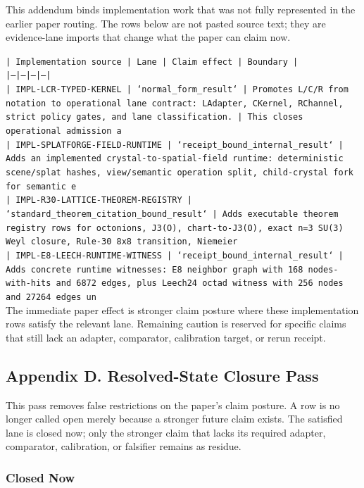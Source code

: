\documentclass[11pt]{article}
\begin{document}
This addendum binds implementation work that was not fully represented in the earlier paper routing. The rows below are not pasted source text; they are evidence-lane imports that change what the paper can claim now.

\noindent\texttt{| Implementation source | Lane | Claim effect | Boundary |}\\
\noindent\texttt{|---|---|---|---|}\\
\noindent\texttt{| IMPL-LCR-TYPED-KERNEL | `normal\_form\_result` | Promotes L/C/R from notation to operational lane contract: LAdapter, CKernel, RChannel, strict policy gates, and lane classification. | This closes operational admission a}\\
\noindent\texttt{| IMPL-SPLATFORGE-FIELD-RUNTIME | `receipt\_bound\_internal\_result` | Adds an implemented crystal-to-spatial-field runtime: deterministic scene/splat hashes, view/semantic operation split, child-crystal fork for semantic e}\\
\noindent\texttt{| IMPL-R30-LATTICE-THEOREM-REGISTRY | `standard\_theorem\_citation\_bound\_result` | Adds executable theorem registry rows for octonions, J3(O), chart-to-J3(O), exact n=3 SU(3) Weyl closure, Rule-30 8x8 transition, Niemeier }\\
\noindent\texttt{| IMPL-E8-LEECH-RUNTIME-WITNESS | `receipt\_bound\_internal\_result` | Adds concrete runtime witnesses: E8 neighbor graph with 168 nodes-with-hits and 6872 edges, plus Leech24 octad witness with 256 nodes and 27264 edges un}\\

The immediate paper effect is stronger claim posture where these implementation rows satisfy the relevant lane. Remaining caution is reserved for specific claims that still lack an adapter, comparator, calibration target, or rerun receipt.

\subsection*{Appendix D. Resolved-State Closure Pass}

This pass removes false restrictions on the paper's claim posture. A row is no longer called open merely because a stronger future claim exists. The satisfied lane is closed now; only the stronger claim that lacks its required adapter, comparator, calibration, or falsifier remains as residue.

\subsubsection*{Closed Now}
\end{document}
